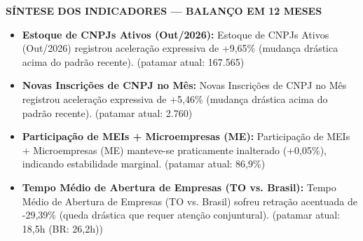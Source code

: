 \documentclass[10pt,a4paper]{article}
\begin{document}
{\hfill%
%
}

\vspace{0.03cm}
\par\vspace{0.05cm}
\par\vspace{4pt}
{\fontsize{7.8}{9.4}\selectfont\bfseries\color{corprimaria}\MakeUppercase{Síntese dos Indicadores — Balanço em 12 Meses}}\par\vspace{2pt}
{\scriptsize\color{cinzatexto}
\begin{itemize}[leftmargin=10pt, itemsep=1.2pt, topsep=1pt, parsep=0pt]
   \item \textbf{\color{corprimaria}Estoque de CNPJs Ativos (Out/2026):} Estoque de CNPJs Ativos (Out/2026) registrou aceleração expressiva de +9,65\% (mudança drástica acima do padrão recente). (patamar atual: 167.565)
   \item \textbf{\color{corprimaria}Novas Inscrições de CNPJ no Mês:} Novas Inscrições de CNPJ no Mês registrou aceleração expressiva de +5,46\% (mudança drástica acima do padrão recente). (patamar atual: 2.760)
   \item \textbf{\color{corprimaria}Participação de MEIs + Microempresas (ME):} Participação de MEIs + Microempresas (ME) manteve-se praticamente inalterado (+0,05\%), indicando estabilidade marginal. (patamar atual: 86,9\%)
   \item \textbf{\color{corprimaria}Tempo Médio de Abertura de Empresas (TO vs. Brasil):} Tempo Médio de Abertura de Empresas (TO vs. Brasil) sofreu retração acentuada de -29,39\% (queda drástica que requer atenção conjuntural). (patamar atual: 18,5h (BR: 26,2h))
\end{itemize}
}
\par\vspace{0.05cm}
\end{document}
